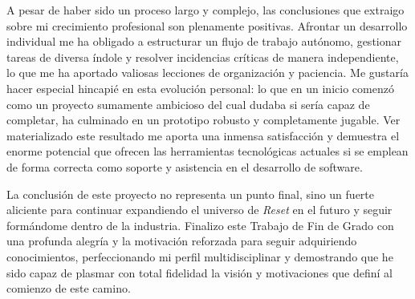 A pesar de haber sido un proceso largo y complejo, las conclusiones que extraigo sobre mi crecimiento profesional son plenamente positivas. Afrontar un desarrollo individual me ha obligado a estructurar un flujo de trabajo autónomo, gestionar tareas de diversa índole y resolver incidencias críticas de manera independiente, lo que me ha aportado valiosas lecciones de organización y paciencia. Me gustaría hacer especial hincapié en esta evolución personal: lo que en un inicio comenzó como un proyecto sumamente ambicioso del cual dudaba si sería capaz de completar, ha culminado en un prototipo robusto y completamente jugable. Ver materializado este resultado me aporta una inmensa satisfacción y demuestra el enorme potencial que ofrecen las herramientas tecnológicas actuales si se emplean de forma correcta como soporte y asistencia en el desarrollo de software.

La conclusión de este proyecto no representa un punto final, sino un fuerte aliciente para continuar expandiendo el universo de \textit{Reset} en el futuro y seguir formándome dentro de la industria. Finalizo este Trabajo de Fin de Grado con una profunda alegría y la motivación reforzada para seguir adquiriendo conocimientos, perfeccionando mi perfil multidisciplinar y demostrando que he sido capaz de plasmar con total fidelidad la visión y motivaciones que definí al comienzo de este camino.